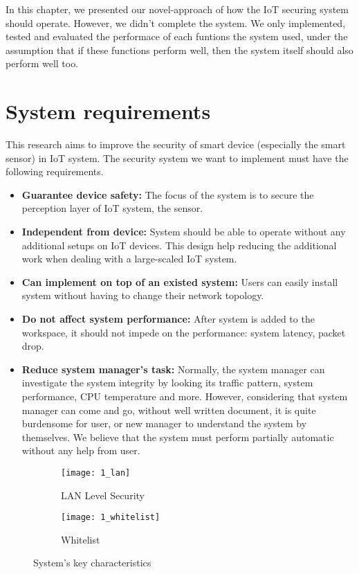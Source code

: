 In this chapter, we presented our novel-approach of how the IoT securing system should operate. However, we didn't complete the system. We only implemented, tested and evaluated the performace of each funtions the system used, under the assumption that if these functions perform well, then the system itself should also perform well too.

\section{System requirements}
This research aims to improve the security of smart device (especially the smart sensor) in IoT system. 
The security system we want to implement must have the following requirements. 

\begin{itemize}
    \item \textbf{Guarantee device safety:} The focus of the system is to secure the perception layer of IoT system, the sensor.  
    \item \textbf{Independent from device:} System should be able to operate without any additional setups on IoT devices. This design help reducing the additional work when dealing with a large-scaled IoT system.    
    \item \textbf{Can implement on top of an existed system:} Users can easily install system without having to change their network topology.
    \item \textbf{Do not affect system performance:} After system is added to the workspace, it should not impede on the performance: system latency, packet drop.
    \item \textbf{Reduce system manager’s task:} Normally, the system manager can investigate the system integrity by looking its traffic pattern, system performance, CPU temperature and more. However, considering that system manager can come and go, without well written document, it is quite burdensome for user, or new manager to understand the system by themselves. We believe that the system must perform partially automatic without any help from user.
\end{itemize}

\begin{figure}
    \centering
    \begin{subfigure}[b]{0.4\textwidth}
        \centering
        \texttt{[image: 1\_lan]}
        \caption{LAN Level Security}
        \label{fig:s3_lan} 
    \end{subfigure}
    \hspace{1.5cm}
    \begin{subfigure}[b]{0.4\textwidth}
        \centering
        \texttt{[image: 1\_whitelist]}
        \caption{Whitelist}
        \label{fig:s3_whitelist}
    \end{subfigure} 
    \caption{System's key characteristics}
    \label{fig:s3_system_characteristics}
\end{figure}


